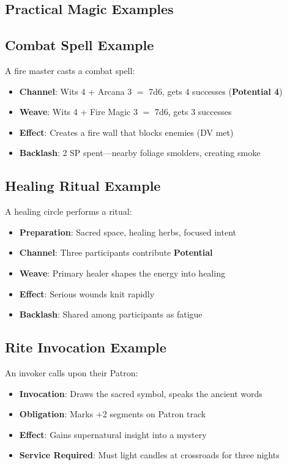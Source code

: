 \begin{multicols}{2}
\section{Practical Magic Examples} 

\subsection*{Combat Spell Example}
A fire master casts a combat spell:
\begin{itemize}
\item \textbf{Channel}: Wits 4 + Arcana 3 $=$ 7d6, gets 4 successes (\textbf{Potential 4})
\item \textbf{Weave}: Wits 4 + Fire Magic 3 $=$ 7d6, gets 3 successes
\item \textbf{Effect}: Creates a fire wall that blocks enemies (DV met)
\item \textbf{Backlash}: 2 SP spent—nearby foliage smolders, creating smoke
\end{itemize}

\subsection*{Healing Ritual Example}
A healing circle performs a ritual:
\begin{itemize}
\item \textbf{Preparation}: Sacred space, healing herbs, focused intent
\item \textbf{Channel}: Three participants contribute \textbf{Potential}
\item \textbf{Weave}: Primary healer shapes the energy into healing
\item \textbf{Effect}: Serious wounds knit rapidly
\item \textbf{Backlash}: Shared among participants as fatigue
\end{itemize}

\subsection*{Rite Invocation Example}
An invoker calls upon their Patron:
\begin{itemize}
\item \textbf{Invocation}: Draws the sacred symbol, speaks the ancient words
\item \textbf{Obligation}: Marks +2 segments on Patron track
\item \textbf{Effect}: Gains supernatural insight into a mystery
\item \textbf{Service Required}: Must light candles at crossroads for three nights
\end{itemize}


\end{multicols}
